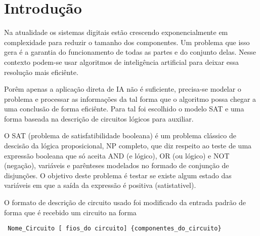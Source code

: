 \section{Introdução}
\label{sec:introducao}

Na atualidade os sistemas digitais estão crescendo exponencialmente em complexidade para reduzir o tamanho dos componentes. Um problema que isso gera é a garantia do funcionamento de todas as partes e do conjunto delas. Nesse contexto podem-se usar algoritmos de inteligência artificial para deixar essa resolução mais eficiênte.

Porêm apenas a aplicação direta de IA não é suficiente, precisa-se modelar o problema e processar as informações da tal forma que o algoritmo possa chegar a uma conclusão de forma eficiênte. Para tal foi escolhido o modelo SAT e uma forma baseada na descrição de circuitos lógicos para auxiliar. 

O SAT (problema de satisfatibilidade booleana) é um problema clássico de descisão da lógica proposicional, NP completo, que diz respeito ao teste de uma expressão booleana que só aceita AND (e lógico), OR (ou lógico) e NOT (negação), variáveis e parênteses modelados no formado de conjunção de disjunções. O objetivo deste problema é testar se existe algum estado das variáveis em que a saída da expressão é positiva (satistativel).

O formato de descrição de circuito usado foi modificado da entrada padrão de forma que é recebido um circuito na forma
\begin{lstlisting}
 Nome_Circuito [ fios_do circuito] {componentes_do_circuito}
\end{lstlisting}